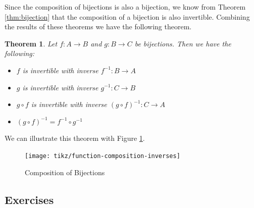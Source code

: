 \documentclass[
]{book}
\newtheorem{theorem}{Theorem}[chapter]
\theoremstyle{definition}
\theoremstyle{definition}
\theoremstyle{definition}
\theoremstyle{remark}
\begin{document}
Since the composition of bijections is also a bijection, we know from Theorem \ref{thm:bijection} that the composition of a bijection is also invertible. Combining the results of these theorems we have the following theorem.

\begin{theorem}
\protect\hypertarget{thm:unnamed-chunk-144}{}{\label{thm:unnamed-chunk-144} }Let \(f:A\rightarrow B\) and \(g:B\rightarrow C\) be bijections. Then we have the following:

\begin{itemize}
\item
  \(f\) is invertible with inverse \(f^{-1}:B\rightarrow A\)
\item
  \(g\) is invertible with inverse \(g^{-1}:C\rightarrow B\)
\item
  \(g\circ f\) is invertible with inverse \((g\circ f)^{-1}:C\rightarrow A\)
\item
  \((g\circ f)^{-1} = f^{-1} \circ g^{-1}\)
\end{itemize}
\end{theorem}

We can illustrate this theorem with Figure \ref{fig:composition-bijections}.

\begin{figure}
 
 {\centering \texttt{[image: tikz/function-composition-inverses]} 
 
 }
 
 \caption{Composition of Bijections}\label{fig:composition-bijections}
 \end{figure}

\hypertarget{exercises-18}{%
\subsection{Exercises}\label{exercises-18}}
\end{document}
